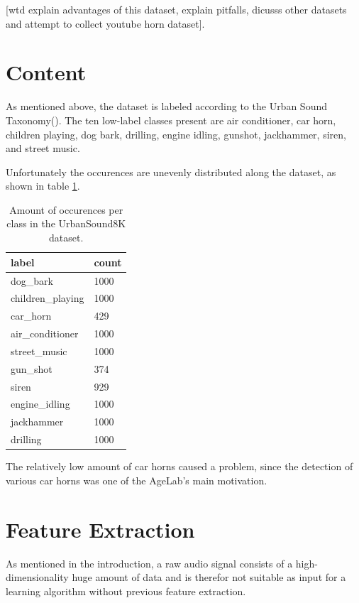 [wtd explain advantages of this dataset, explain pitfalls, dicusss other datasets and attempt to collect youtube horn dataset].

\section{Content}

As mentioned above, the dataset is labeled according to the Urban Sound Taxonomy(\cite{Salamon:UrbanSound:ACMMM:14}). The ten low-label classes present are air conditioner, car horn, children playing, dog bark, drilling, engine idling, gunshot, jackhammer, siren, and street music.

Unfortunately the occurences are unevenly distributed along the dataset, as shown in table \ref{tbl:urbansound8kdistribution}. 

\begin{table}[h]
\centering
\begin{tabular}{ll}
\hline
label & count \\
\hline
dog_bark & 1000 \\
children_playing & 1000 \\
car_horn & 429 \\
air_conditioner & 1000 \\
street_music & 1000 \\
gun_shot & 374 \\
siren & 929 \\
engine_idling & 1000 \\
jackhammer & 1000 \\
drilling & 1000
\end{tabular}
\caption{Amount of occurences per class in the UrbanSound8K dataset.}
\label{tbl:urbansound8kdistribution}
\par
\end{table}

The relatively low amount of car horns caused a problem, since the detection of various car horns was one of the AgeLab's main motivation.



\section{Feature Extraction}

As mentioned in the introduction, a raw audio signal consists of a high-dimensionality huge amount of data and is therefor not suitable as input for a learning algorithm without previous feature extraction.

